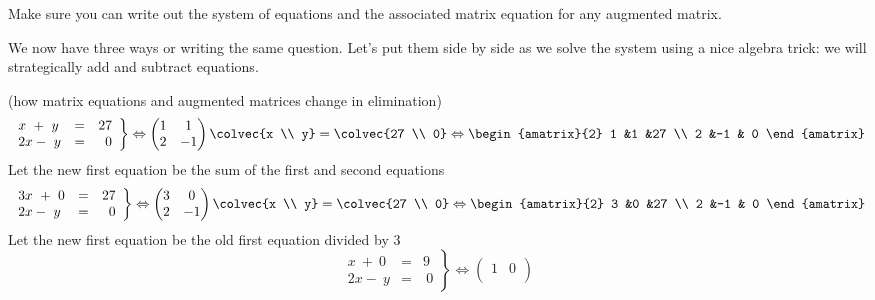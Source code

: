 Make sure you can write out the system of equations and the associated matrix equation for any augmented matrix. 




We now have three ways or writing the same question. 
Let's put them side by side as we solve the system using a nice algebra trick: we will strategically add and subtract equations.

\begin{example}  (how matrix equations and augmented matrices change in elimination)
\[
   \left.
\begin{array}{lcr}
	x\ +\ y & = & 27 \\
	2x-\ y & = &\  0 
     \end{array}
   \right\} 
   \Leftrightarrow
    \begin{pmatrix}
      1             &1  \\
      2             &-1
    \end{pmatrix}
  \colvec{x \\ y}
  =
  \colvec{27 \\ 0}
  \Leftrightarrow
 \begin{amatrix}{2}
1 &1 &27 \\ 2 &-1 & 0
\end{amatrix}
\]
Let the new first equation be the sum of the first and second equations
\[
   \left.
\begin{array}{lcr}
	3x\ +\ 0 & = & 27 \\
	2x-\ y & = &\  0 
     \end{array}
   \right\} 
   \Leftrightarrow
    \begin{pmatrix}
      3             &0  \\
      2             &-1
    \end{pmatrix}
  \colvec{x \\ y}
  =
  \colvec{27 \\ 0}
  \Leftrightarrow
 \begin{amatrix}{2}
3 &0 &27 \\ 2 &-1 & 0
\end{amatrix}
\]
Let the new first equation be the old first equation divided by 3
\[
   \left.
\begin{array}{lcr}
	x\ +\ 0 & = & 9 \\
	2x-\ y & = &\  0 
     \end{array}
   \right\} 
   \Leftrightarrow
    \begin{pmatrix}
      1             &0  \\

\end{pmatrix}\]
\end{example}
